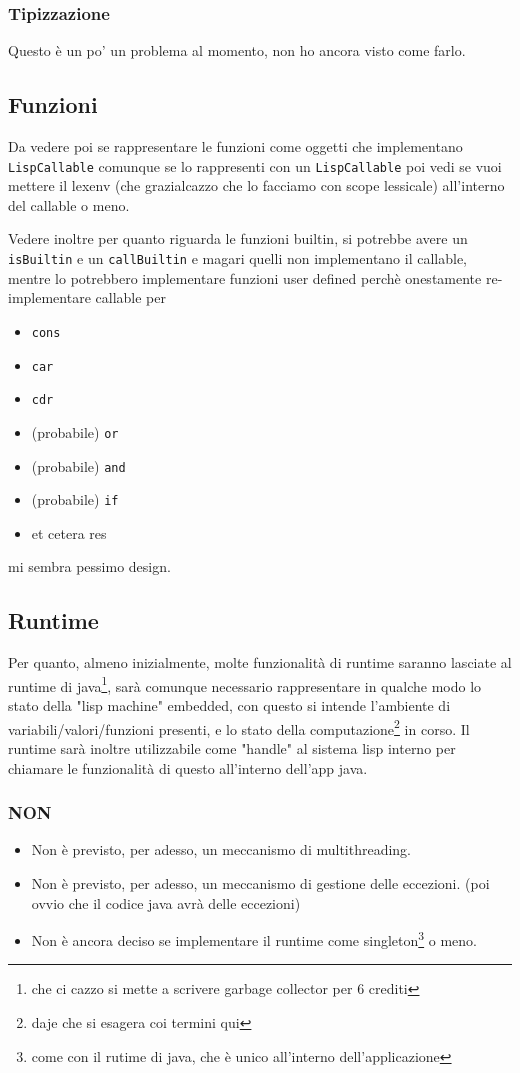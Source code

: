 \documentclass[11pt]{article}
\begin{document}
\subsubsection{Tipizzazione}
\label{sec:org029869c}
Questo è un po' un problema al momento, non ho ancora visto come farlo.

\subsection{Funzioni}
\label{sec:org8eb5391}
Da vedere poi se rappresentare le funzioni come oggetti che implementano \texttt{LispCallable}
comunque se lo rappresenti con un \texttt{LispCallable} poi vedi se vuoi mettere il lexenv (che grazialcazzo che lo facciamo con scope lessicale) all'interno del callable o meno.

Vedere inoltre per quanto riguarda le funzioni builtin, si potrebbe avere un \texttt{isBuiltin} e un \texttt{callBuiltin} e magari quelli non implementano il callable, mentre lo potrebbero implementare funzioni user defined
perchè onestamente re-implementare callable per
\begin{itemize}
\item \texttt{cons}
\item \texttt{car}
\item \texttt{cdr}
\item (probabile) \texttt{or}
\item (probabile) \texttt{and}
\item (probabile) \texttt{if}
\item et cetera res
\end{itemize}

mi sembra pessimo design.

\subsection{Runtime}
\label{sec:org6539906}
Per quanto, almeno inizialmente, molte funzionalità di runtime saranno lasciate al runtime di java\footnote{che ci cazzo si mette a scrivere garbage collector per 6 crediti}, sarà comunque necessario rappresentare in qualche modo lo stato della "lisp machine" embedded, con questo si intende l'ambiente di variabili/valori/funzioni presenti, e lo stato della computazione\footnote{daje che si esagera coi termini qui} in corso.
Il runtime sarà inoltre utilizzabile come "handle" al sistema lisp interno per chiamare le funzionalità di questo all'interno dell'app java.
\subsubsection{NON}
\label{sec:orgf3899e1}
\begin{itemize}
\item Non è previsto, per adesso, un meccanismo di multithreading.
\item Non è previsto, per adesso, un meccanismo di gestione delle eccezioni. (poi ovvio che il codice java avrà delle eccezioni)
\item Non è ancora deciso se implementare il runtime come singleton\footnote{come con il rutime di java, che è unico all'interno dell'applicazione} o meno.
\end{itemize}
\end{document}
